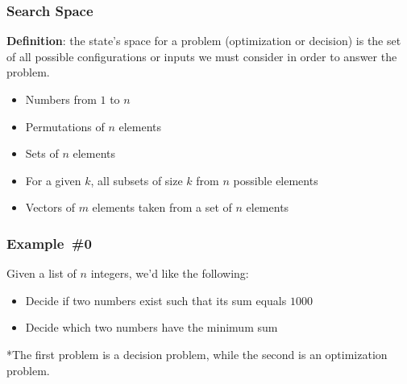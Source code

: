 \documentclass{beamer}
\begin{document}
\begin{frame}[fragile]
\frametitle{Search Space}

\textbf{Definition}: the state's space for a problem (optimization or decision) is the set of all possible configurations or inputs we must consider in order to answer the problem.

\vspace{0.5cm}

\begin{itemize}
    \item Numbers from $1$ to $n$
    \item Permutations of $n$ elements
    \item Sets of $n$ elements
    \item For a given $k$, all subsets of size $k$ from $n$ possible elements
    \item Vectors of $m$ elements taken from a set of $n$ elements
\end{itemize}

\end{frame}

\begin{frame}[fragile]
\frametitle{Example \#0}

\vspace{0.3cm}
Given a list of $n$ integers, we'd like the following:
\begin{itemize}
    \item Decide if two numbers exist such that its sum equals $1000$
    \item Decide which two numbers have the minimum sum
\end{itemize}

\vspace{0.5cm}
*The first problem is a \color{blue}decision \color{black} problem, while the second is an \color{blue}optimization \color{black} problem.

\end{frame}
\end{document}
